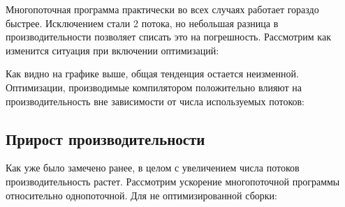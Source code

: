 \vspace{0.5cm}

Многопоточная программа практически во всех случаях работает гораздо быстрее.
Исключением стали 2 потока, но небольшая разница в производительности позволяет списать это на погрешность.
Рассмотрим как изменится ситуация при включении оптимизаций:

\vspace{0.5cm}


\vspace{0.5cm}

Как видно на графике выше, общая тенденция остается неизменной.
Оптимизации, производимые компилятором положительно влияют на производительность вне зависимости от числа используемых потоков: 

\vspace{0.5cm}


\vspace{0.5cm}

\subsection{Прирост производительности}

Как уже было замечено ранее, в целом с увеличением числа потоков производительность растет.
Рассмотрим ускорение многопоточной программы относительно однопоточной.
Для не оптимизированной сборки:

